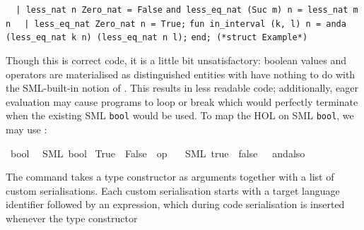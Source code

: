 \begin{isabellebody}
\begin{isamarkuptext}
\verb|  |\verb,|,\verb| less_nat n Zero_nat = False|\newline%
\verb|and less_eq_nat (Suc m) n = less_nat m n|\newline%
\verb|  |\verb,|,\verb| less_eq_nat Zero_nat n = True;|\newline%
\newline%
\verb|fun in_interval (k, l) n = anda (less_eq_nat k n) (less_eq_nat n l);|\newline%
\newline%
\verb|end; (*struct Example*)|%
\end{isamarkuptext}%
\isamarkuptrue%
%
\endisatagquote
{\isafoldquote}%
%
\isadelimquote
%
\endisadelimquote
%
\begin{isamarkuptext}%
\noindent Though this is correct code, it is a little bit unsatisfactory:
  boolean values and operators are materialised as distinguished
  entities with have nothing to do with the SML-built-in notion
  of .  This results in less readable code;
  additionally, eager evaluation may cause programs to
  loop or break which would perfectly terminate when
  the existing SML \verb|bool| would be used.  To map
  the HOL  on SML \verb|bool|, we may use
  :%
\end{isamarkuptext}%
\isamarkuptrue%
%
\isadelimquotett
%
\endisadelimquotett
%
\isatagquotett
{}\isamarkupfalse%
\ bool\isanewline
\ \ {\isacharparenleft}SML\ {\isachardoublequoteopen}bool{\isachardoublequoteclose}{\isacharparenright}\isanewline
{}\isamarkupfalse%
\ True\ \ False\ \ {\isachardoublequoteopen}op\ {\isasymand}{\isachardoublequoteclose}\isanewline
\ \ {\isacharparenleft}SML\ {\isachardoublequoteopen}true{\isachardoublequoteclose}\ \ {\isachardoublequoteopen}false{\isachardoublequoteclose}\ \ {\isachardoublequoteopen}{\isacharunderscore}\ andalso\ {\isacharunderscore}{\isachardoublequoteclose}{\isacharparenright}%
\endisatagquotett
{\isafoldquotett}%
%
\isadelimquotett
%
\endisadelimquotett
%
\begin{isamarkuptext}%
\noindent The \hyperlink{command.code-type}{\mbox{}} command takes a type constructor
  as arguments together with a list of custom serialisations.
  Each custom serialisation starts with a target language
  identifier followed by an expression, which during
  code serialisation is inserted whenever the type constructor

\end{isamarkuptext}
\end{isabellebody}
